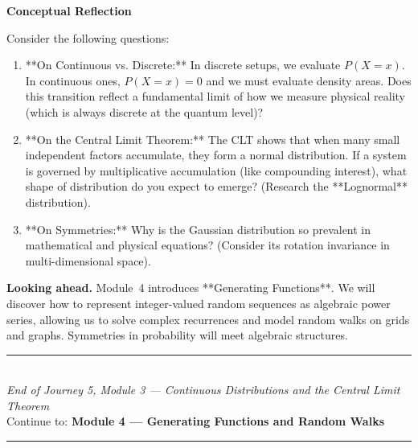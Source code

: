 \documentclass[12pt, a4paper]{article}
\begin{document}
\begin{reflectionbox}
\textbf{Conceptual Reflection}

Consider the following questions:
\begin{enumerate}
  \item **On Continuous vs. Discrete:** In discrete setups, we evaluate $P(X=x)$. In continuous ones, $P(X=x)=0$ and we must evaluate density areas. Does this transition reflect a fundamental limit of how we measure physical reality (which is always discrete at the quantum level)?
  \item **On the Central Limit Theorem:** The CLT shows that when many small independent factors accumulate, they form a normal distribution. If a system is governed by multiplicative accumulation (like compounding interest), what shape of distribution do you expect to emerge? (Research the **Lognormal** distribution).
  \item **On Symmetries:** Why is the Gaussian distribution so prevalent in mathematical and physical equations? (Consider its rotation invariance in multi-dimensional space).
\end{enumerate}
\end{reflectionbox}

\medskip
\noindent\textbf{Looking ahead.}
Module~4 introduces **Generating Functions**. We will discover how to represent integer-valued random sequences as algebraic power series, allowing us to solve complex recurrences and model random walks on grids and graphs. Symmetries in probability will meet algebraic structures.

\vspace{1.4cm}
\begin{center}
{\color{MidBlue}\rule{0.5\linewidth}{0.8pt}}\\[6pt]
{\small\color{DarkGrey}\textit{End of Journey 5, Module 3 --- Continuous Distributions and the Central Limit Theorem}}\\[4pt]
{\small\color{DarkGrey}Continue to: \textbf{Module 4 --- Generating Functions and Random Walks}}\\[6pt]
{\color{MidBlue}\rule{0.5\linewidth}{0.8pt}}
\end{center}
\end{document}
